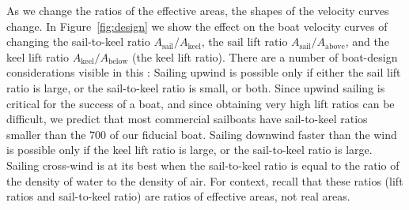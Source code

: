 \documentclass[letterpaper]{article}
\newcommand{\sail}{\text{sail}}
\newcommand{\keel}{\text{keel}}
\renewcommand{\above}{\text{above}}
\newcommand{\below}{\text{below}}
\newcommand{\figref}[1]{Figure~\ref{#1}}
\begin{document}
As we change the ratios of the effective areas, the shapes of the velocity curves change.
In \figref{fig:design} we show the effect on the boat velocity curves of changing the sail-to-keel ratio $A_\sail/A_\keel$, the sail lift ratio $A_\sail/A_\above$, and the keel lift ratio $A_\keel/A_\below$ (the keel lift ratio).
There are a number of boat-design considerations visible in this \figurename:
Sailing upwind is possible only if either the sail lift ratio is large, or the sail-to-keel ratio is small, or both.
Since upwind sailing is critical for the success of a boat, and since obtaining very high lift ratios can be difficult, we predict that most commercial sailboats have sail-to-keel ratios smaller than the 700 of our fiducial boat.
Sailing downwind faster than the wind is possible only if the keel lift ratio is large, or the sail-to-keel ratio is large.
Sailing cross-wind is at its best when the sail-to-keel ratio is equal to the ratio of the density of water to the density of air.
For context, recall that these ratios (lift ratios and sail-to-keel ratio) are ratios of effective areas, not real areas.
\end{document}
